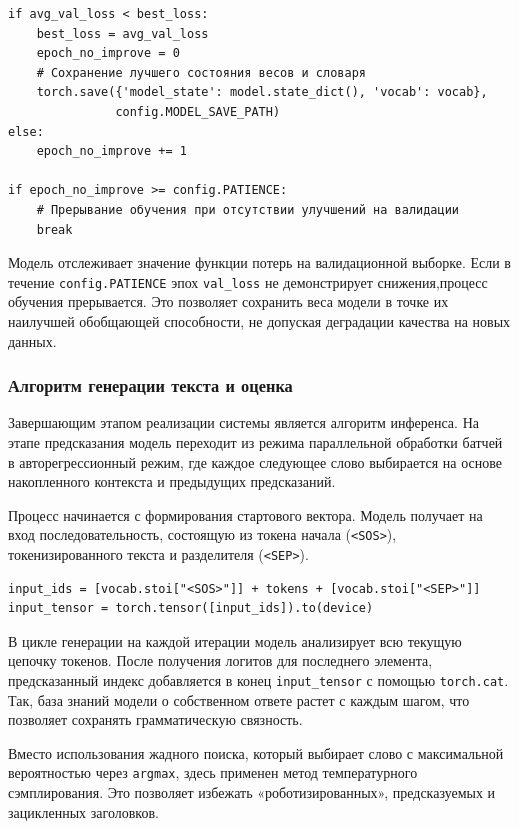 \documentclass[coursework]{SCWorks}
\begin{document}
    \begin{verbatim}
if avg_val_loss < best_loss:
    best_loss = avg_val_loss
    epoch_no_improve = 0
    # Сохранение лучшего состояния весов и словаря
    torch.save({'model_state': model.state_dict(), 'vocab': vocab},
               config.MODEL_SAVE_PATH)
else:
    epoch_no_improve += 1

if epoch_no_improve >= config.PATIENCE:
    # Прерывание обучения при отсутствии улучшений на валидации
    break
    \end{verbatim}

    Модель отслеживает значение функции потерь на валидационной выборке.
    Если в течение \texttt{config.PATIENCE} эпох \texttt{val\_loss} не демонстрирует снижения,процесс обучения прерывается.
    Это позволяет сохранить веса модели в точке их наилучшей обобщающей способности, не допуская деградации качества на новых данных.

    \subsubsection{Алгоритм генерации текста и оценка}

    Завершающим этапом реализации системы является алгоритм инференса.
    На этапе предсказания модель переходит из режима параллельной обработки батчей в авторегрессионный режим,
    где каждое следующее слово выбирается на основе накопленного контекста и предыдущих предсказаний.

    Процесс начинается с формирования стартового вектора.
    Модель получает на вход последовательность, состоящую из токена начала (\texttt{<SOS>}),
    токенизированного текста и разделителя (\texttt{<SEP>}).

    \begin{verbatim}
input_ids = [vocab.stoi["<SOS>"]] + tokens + [vocab.stoi["<SEP>"]]
input_tensor = torch.tensor([input_ids]).to(device)
    \end{verbatim}

    В цикле генерации на каждой итерации модель анализирует всю текущую цепочку токенов.
    После получения логитов для последнего элемента,
    предсказанный индекс добавляется в конец \texttt{input\_tensor} с помощью \texttt{torch.cat}.
    Так, база знаний модели о собственном ответе растет с каждым шагом, что позволяет сохранять грамматическую связность.

    Вместо использования жадного поиска, который выбирает слово с максимальной вероятностью через \texttt{argmax},
    здесь применен метод температурного сэмплирования.
    Это позволяет избежать «роботизированных», предсказуемых и зацикленных заголовков.
\end{document}
